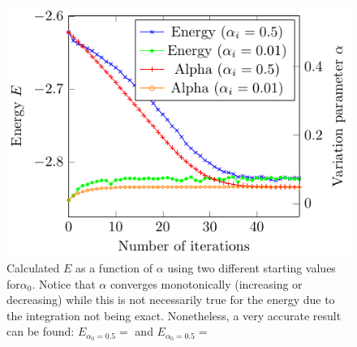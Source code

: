 \begin{figure}
  \begin{center}
  \includegraphics[scale=1 ]{graphs/he-e-alpha-iterations.pdf}
  \caption{
  	Calculated $E$ as a function of $\alpha$ using two different starting values for$\alpha_0$. Notice that $\alpha$ converges monotonically (increasing or decreasing) while this is not necessarily true for the energy due to the integration not being exact. Nonetheless, a very accurate result can be found: $E_{\alpha_0 = 0.5} =  $ and $E_{\alpha_0 = 0.5} =  $
  	}
  \label{fig:He_it}
  \end{center}
\end{figure}
